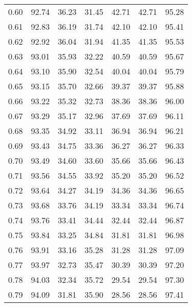 \begin{tabular}{|c|c|c|c|c|c|c|}
      0.60 &     92.74 &     36.23 &      31.45 &   42.71 &      42.71 &         95.28 \\
      0.61 &     92.83 &     36.19 &      31.74 &   42.10 &      42.10 &         95.41 \\
      0.62 &     92.92 &     36.04 &      31.94 &   41.35 &      41.35 &         95.53 \\
      0.63 &     93.01 &     35.93 &      32.22 &   40.59 &      40.59 &         95.67 \\
      0.64 &     93.10 &     35.90 &      32.54 &   40.04 &      40.04 &         95.79 \\
      0.65 &     93.15 &     35.70 &      32.66 &   39.37 &      39.37 &         95.88 \\
      0.66 &     93.22 &     35.32 &      32.73 &   38.36 &      38.36 &         96.00 \\
      0.67 &     93.29 &     35.17 &      32.96 &   37.69 &      37.69 &         96.11 \\
      0.68 &     93.35 &     34.92 &      33.11 &   36.94 &      36.94 &         96.21 \\
      0.69 &     93.43 &     34.75 &      33.36 &   36.27 &      36.27 &         96.33 \\
      0.70 &     93.49 &     34.60 &      33.60 &   35.66 &      35.66 &         96.43 \\
      0.71 &     93.56 &     34.55 &      33.92 &   35.20 &      35.20 &         96.52 \\
      0.72 &     93.64 &     34.27 &      34.19 &   34.36 &      34.36 &         96.65 \\
      0.73 &     93.68 &     33.76 &      34.19 &   33.34 &      33.34 &         96.74 \\
      0.74 &     93.76 &     33.41 &      34.44 &   32.44 &      32.44 &         96.87 \\
      0.75 &     93.84 &     33.25 &      34.84 &   31.81 &      31.81 &         96.98 \\
      0.76 &     93.91 &     33.16 &      35.28 &   31.28 &      31.28 &         97.09 \\
      0.77 &     93.97 &     32.73 &      35.47 &   30.39 &      30.39 &         97.20 \\
      0.78 &     94.03 &     32.34 &      35.72 &   29.54 &      29.54 &         97.30 \\
      0.79 &     94.09 &     31.81 &      35.90 &   28.56 &      28.56 &         97.41 \\

\end{tabular}
